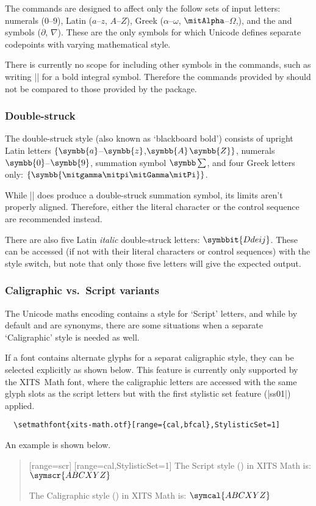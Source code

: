 The  commands are designed to affect only the follow sets of input letters: numerals ($0$--$9$), Latin ($a$--$z$, $A$--$Z$), Greek ($\alpha$--$\omega$, $\Alpha$--$\Omega$,), and the  and  symbols ($\partial$, $\nabla$).
These are the only symbols for which Unicode defines separate codepoints with varying mathematical style.

There is currently no scope for including other symbols in the  commands, such as writing |\symbf{\int}| for a bold integral symbol.
Therefore the commands provided by  should not be compared to those provided by the  package.

\subsubsection{Double-struck}

The double-struck style (also known as `blackboard bold') consists of
upright Latin letters $\{\symbb{a}$--$\symbb{z}$,$\symbb{A}$$\symbb{Z}\}$,
numerals $\symbb{0}$--$\symbb{9}$, summation symbol $\symbb\sum$, and four
Greek letters only: $\{\symbb{\gamma\pi\Gamma\Pi}\}$.

While |\symbb{\sum}| does produce a double-struck summation symbol,
its limits aren't properly aligned. Therefore,
either the literal character or the control sequence  are
recommended instead.

There are also five Latin \emph{italic} double-struck letters: $\symbbit{Ddeij}$.
These can be accessed (if not with their literal characters or control sequences)
with the  style switch, but note that only those five letters
will give the expected output.

\subsubsection{Caligraphic vs.\ Script variants}

The Unicode maths encoding contains a style for `Script' letters,
and while by default  and 
are synonyms, there are some situations when a
separate `Caligraphic' style is needed as well.

If a font contains alternate glyphs for a separat caligraphic style,
they can be selected explicitly as shown below.
This feature is currently only supported by the XITS~Math font, where
the caligraphic letters are accessed with the same glyph slots as the
script letters but with the first stylistic set feature (|ss01|) applied.
\begin{verbatim}
  \setmathfont{xits-math.otf}[range={cal,bfcal},StylisticSet=1]
\end{verbatim}
An example is shown below.
\begin{quote}
[range=scr]
[range=cal,StylisticSet=1]
The Script style () in XITS Math is: $\symscr{ABCXYZ}$\par
The Caligraphic style () in XITS Math is: $\symcal{ABCXYZ}$
\end{quote}


